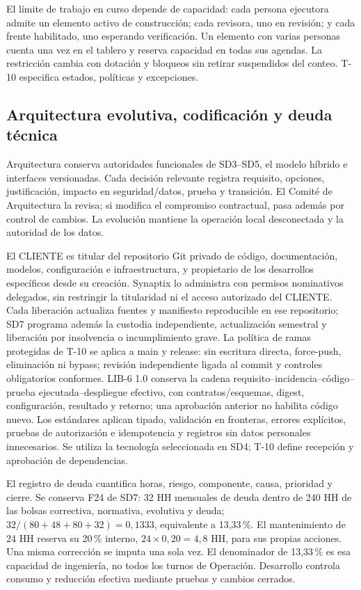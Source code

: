 El límite de trabajo en curso depende de capacidad: cada persona ejecutora admite un elemento activo de construcción; cada revisora, uno en revisión; y cada frente habilitado, uno esperando verificación. Un elemento con varias personas cuenta una vez en el tablero y reserva capacidad en todas sus agendas. La restricción cambia con dotación y bloqueos sin retirar suspendidos del conteo. T-10 especifica estados, políticas y excepciones.

\subsection{Arquitectura evolutiva, codificación y deuda técnica}
Arquitectura conserva autoridades funcionales de SD3--SD5, el modelo híbrido e interfaces versionadas. Cada decisión relevante registra requisito, opciones, justificación, impacto en seguridad/datos, prueba y transición. El Comité de Arquitectura la revisa; si modifica el compromiso contractual, pasa además por control de cambios. La evolución mantiene la operación local desconectada y la autoridad de los datos.

El CLIENTE es titular del repositorio Git privado de código, documentación, modelos, configuración e infraestructura, y propietario de los desarrollos específicos desde su creación. Synaptix lo administra con permisos nominativos delegados, sin restringir la titularidad ni el acceso autorizado del CLIENTE. Cada liberación actualiza fuentes y manifiesto reproducible en ese repositorio; SD7 programa además la custodia independiente, actualización semestral y liberación por insolvencia o incumplimiento grave. La política de ramas protegidas de T-10 se aplica a main y release: sin escritura directa, force-push, eliminación ni bypass; revisión independiente ligada al commit y controles obligatorios conformes. LIB-6 1.0 conserva la cadena requisito--incidencia--código--prueba ejecutada--despliegue efectivo, con contratos/esquemas, digest, configuración, resultado y retorno; una aprobación anterior no habilita código nuevo. Los estándares aplican tipado, validación en fronteras, errores explícitos, pruebas de autorización e idempotencia y registros sin datos personales innecesarios. Se utiliza la tecnología seleccionada en SD4; T-10 define recepción y aprobación de dependencias. \parencites[art.~84.1/6, p.~43]{sd6-ba}[RT-04.03/04, p.~10; RT-11.26, p.~24]{sd6-bt}[PS.1; PW.4--PW.8, tabla~1]{sd6-ssdf}

El registro de deuda cuantifica horas, riesgo, componente, causa, prioridad y cierre. Se conserva F24 de SD7: 32 HH mensuales de deuda dentro de 240 HH de las bolsas correctiva, normativa, evolutiva y deuda; $32/(80+48+80+32)=0,1333$, equivalente a 13,33\,\%. El mantenimiento de 24 HH reserva su 20\,\% interno, $24\times0,20=4,8$ HH, para sus propias acciones. Una misma corrección se imputa una sola vez. El denominador de 13,33\,\% es esa capacidad de ingeniería, no todos los turnos de Operación. Desarrollo controla consumo y reducción efectiva mediante pruebas y cambios cerrados. \parencite[RT-21.21, p.~38]{sd6-bt}

